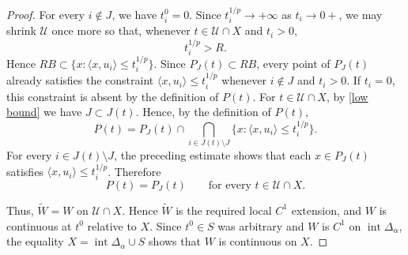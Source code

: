 \documentclass[10pt,a4paper]{amsart}
\begin{document}
\begin{proof}
	For every \(i\notin J\), we have \(t_i^0=0\). Since
	\(t_i^{1/p}\to+\infty\) as \(t_i\to0+\), we may shrink
	\(\mathcal U\) once more so that, whenever
	\(t\in\mathcal U\cap X\) and \(t_i>0\),
	\[
	t_i^{1/p}>R.
	\]
	Hence \(RB\subset\{x:\langle x,u_i\rangle\leq t_i^{1/p}\}\).
	Since \(P_J(t)\subset RB\), every point of \(P_J(t)\) already satisfies
	the constraint \(\langle x,u_i\rangle\leq t_i^{1/p}\) whenever
	\(i\notin J\) and \(t_i>0\). If \(t_i=0\), this constraint is absent by
	the definition of \(P(t)\). For \(t\in\mathcal U\cap X\), by \eqref{low bound} we have \(J\subset J(t)\). Hence, by the definition of
	\(P(t)\),
	\[
	P(t)
	=
	P_J(t)\cap
	\bigcap_{i\in J(t)\setminus J}
	\{x:\langle x,u_i\rangle\leq t_i^{1/p}\}.
	\]
	For every \(i\in J(t)\setminus J\), the preceding estimate shows that
	each \(x\in P_J(t)\) satisfies
	\(\langle x,u_i\rangle\leq t_i^{1/p}\). Therefore
	\[
	P(t)=P_J(t)
	\qquad
	\text{for every }t\in\mathcal U\cap X.
	\]
	
Thus, \(\widetilde W=W\) on \(\mathcal U\cap X\). Hence
\(\widetilde W\) is the required local \(C^1\) extension, and \(W\)
is continuous at \(t^0\) relative to \(X\). Since \(t^0\in S\)
was arbitrary and \(W\) is \(C^1\) on
\(\operatorname{int}\Delta_\alpha\), the equality
\(X=\operatorname{int}\Delta_\alpha\cup S\) shows that \(W\) is
continuous on \(X\).   
	

\end{proof}
\end{document}
